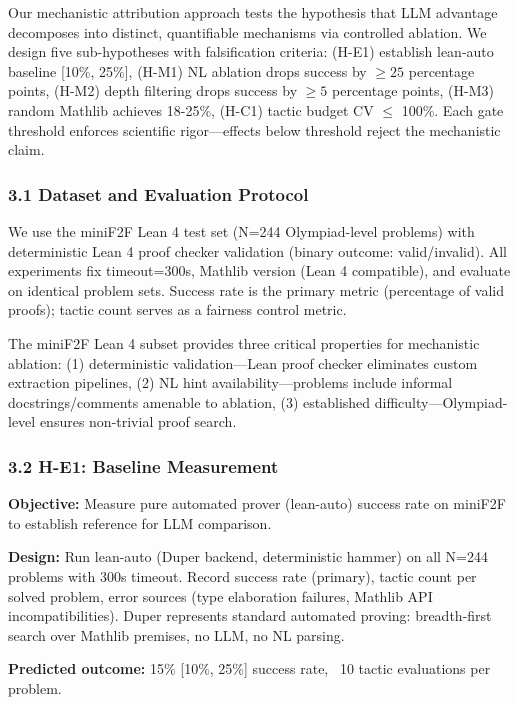 
Our mechanistic attribution approach tests the hypothesis that LLM advantage decomposes into distinct, quantifiable mechanisms via controlled ablation. We design five sub-hypotheses with falsification criteria: (H-E1) establish lean-auto baseline [10\%, 25\%], (H-M1) NL ablation drops success by $\geq 25$ percentage points, (H-M2) depth filtering drops success by $\geq 5$ percentage points, (H-M3) random Mathlib achieves 18-25\%, (H-C1) tactic budget CV $\leq$ 100\%. Each gate threshold enforces scientific rigor---effects below threshold reject the mechanistic claim.

\subsubsection{3.1 Dataset and Evaluation Protocol}

We use the miniF2F Lean 4 test set (N=244 Olympiad-level problems) with deterministic Lean 4 proof checker validation (binary outcome: valid/invalid). All experiments fix timeout=300s, Mathlib version (Lean 4 compatible), and evaluate on identical problem sets. Success rate is the primary metric (percentage of valid proofs); tactic count serves as a fairness control metric.

The miniF2F Lean 4 subset provides three critical properties for mechanistic ablation: (1) deterministic validation---Lean proof checker eliminates custom extraction pipelines, (2) NL hint availability---problems include informal docstrings/comments amenable to ablation, (3) established difficulty---Olympiad-level ensures non-trivial proof search.

\subsubsection{3.2 H-E1: Baseline Measurement}

\textbf{Objective:} Measure pure automated prover (lean-auto) success rate on miniF2F to establish reference for LLM comparison.

\textbf{Design:} Run lean-auto (Duper backend, deterministic hammer) on all N=244 problems with 300s timeout. Record success rate (primary), tactic count per solved problem, error sources (type elaboration failures, Mathlib API incompatibilities). Duper represents standard automated proving: breadth-first search over Mathlib premises, no LLM, no NL parsing.

\textbf{Predicted outcome:} 15\% [10\%, 25\%] success rate, ~10 tactic evaluations per problem.

